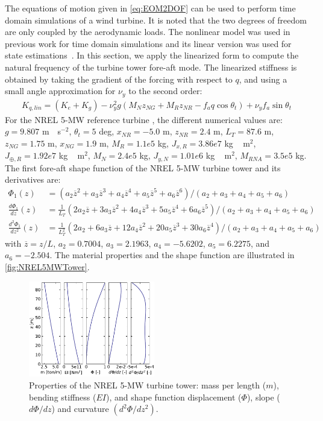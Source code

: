 \documentclass[wes, manuscript]{copernicus}
\renewcommand{\bar}{\overline}
\begin{document}
The equations of motion given in \autoref{eq:EOM2DOF} can be used to perform time domain simulations of a wind turbine.
It is noted that the two degrees of freedom are only coupled by the aerodynamic loads.
The nonlinear model was used in previous work for time domain simulations and its linear version was used for state estimations~\citep{Branlard:2020twin,Branlard:2020twinOF}.
In this section, we apply the linearized form to compute the natural frequency of the turbine tower fore-aft mode.
The linearized stiffness is obtained by taking the gradient of the forcing with respect to $q$, and using a small angle approximation for $\nu_y$ to the second order:
\begin{align}
K_{q,lin}= (K_{e} + K_g)
- \nu_{y}^{2} g \left(M_N z_{NG} + M_{R} z_{NR} - f_a q \cos\theta_t\right)
+ \nu_{y} f_a \sin\theta_t 
\end{align}
For the NREL 5-MW reference turbine \citep{nrel5mw}, the different numerical values are:
$g=9.807$ \unit{m\cdot s}$^{-2}$,
$\theta_t=5$ \unit{deg},
$x_{NR}=-5.0$ \unit{m},
$z_{NR}= 2.4$ \unit{m},
$L_T=87.6$ \unit{m},
$z_{NG}=1.75$ \unit{m},
$x_{NG}=1.9$ \unit{m},
$M_R= 1.1e5$ \unit{kg},
$J_{x,R}=3.86e7$ \unit{kg\,m}$^2$,
$J_{\oplus,R}=1.92e7$ \unit{kg\,m}$^2$,
$M_N=2.4e5$ \unit{kg},
$J_{y,N} =1.01e6$ \unit{kg\,m}$^2$,
$M_{RNA}=3.5e5$ \unit{kg}.
The first fore-aft shape function of the NREL 5-MW turbine tower and its derivatives are:
\begin{align}
   \Phi_1(z) &= (a_2 \bar{z}^2+ a_3 \bar{z}^3+ a_4 \bar{z}^4+ a_5 \bar{z}^5+ a_6 \bar{z}^6)/(a_2+a_3+a_4+a_5+a_6)\nonumber \\
   \frac{d\Phi_1}{dz}(z) &= \frac{1}{L_T}(2a_2 \bar{z}+ 3a_3 \bar{z}^2+ 4a_4 \bar{z}^3+ 5a_5 \bar{z}^4+ 6a_6 \bar{z}^5)/(a_2+a_3+a_4+a_5+a_6)\label{eq:ShapeFunctionsPoly}  \\  
   \frac{d^2\Phi_1}{dz^2}(z) &= \frac{1}{L_T^2}(2a_2+ 6a_3 \bar{z}+ 12a_4 \bar{z}^2+ 20a_5 \bar{z}^3+ 30a_6 \bar{z}^4)/(a_2+a_3+a_4+a_5+a_6) 
   \nonumber
\end{align}
with $\bar{z}=z/L$, $a_2=0.7004$, $ a_3=2.1963$, $a_4=-5.6202$, $a_5=6.2275$, and $a_6=-2.504$.
The material properties and the shape function are illustrated in \autoref{fig:NREL5MWTower}. 
\noindent\begin{figure}[!htb]\centering%
  \includegraphics[width=0.49\textwidth]{figs/NREL5MWTower.pdf}
  \caption{Properties of the NREL 5-MW turbine tower: mass per length ($m$), bending stiffness ($EI$), and shape function displacement ($\Phi$), slope ($d\Phi/dz$) and curvature $(d^2\Phi/dz^2)$.}\label{fig:NREL5MWTower}%
\end{figure}
\end{document}
